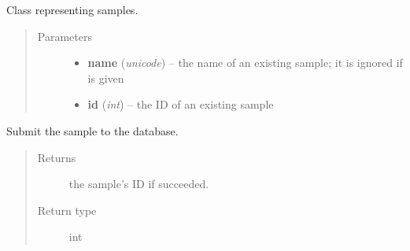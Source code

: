 \documentclass[a4paper,11pt,english]{sphinxmanual}
\begin{document}
\begin{fulllineitems}
\label{programming/remote_client:jb_remote.samples.Sample}
Class representing samples.
\begin{quote}\begin{description}
\item[{Parameters}] \leavevmode\begin{itemize}
\item {} 
\textbf{name} (\emph{unicode}) -- the name of an existing sample; it is ignored if  is
given

\item {} 
\textbf{id} (\emph{int}) -- the ID of an existing sample

\end{itemize}

\end{description}\end{quote}

\begin{fulllineitems}
\label{programming/remote_client:jb_remote.samples.Sample.submit}
Submit the sample to the database.
\begin{quote}\begin{description}
\item[{Returns}] \leavevmode
the sample's ID if succeeded.

\item[{Return type}] \leavevmode
int

\end{description}\end{quote}

\end{fulllineitems}


\end{fulllineitems}

\end{document}

